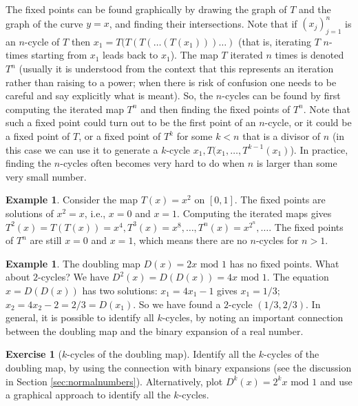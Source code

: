 \documentclass[11pt]{report}
\theoremstyle{plain}
\theoremstyle{definition}
\newtheorem{example}[thm]{Example}
\newtheorem{xexercise}[thm]{Exercise}
\begin{document}
The fixed points can be found graphically by drawing
the graph of $T$ and the graph of the curve $y=x$,
and finding their intersections. Note that if
$(x_j)_{j=1}^n$ is an $n$-cycle of $T$ then
$x_1 = T(T(T(\ldots(T(x_1)))\ldots)$ (that is,
iterating $T$ $n$-times starting from $x_1$ leads
back to $x_1$). The map $T$ iterated $n$ times is
denoted $T^n$ (usually it is understood from the
context that this represents an iteration rather than
raising to a power; when there is risk of confusion
one needs to be careful and say explicitly what is
meant). So, the $n$-cycles can be found by first
computing the iterated map $T^n$ and then finding the
fixed points of $T^n$. Note that such a fixed point
could turn out to be the first point of an $n$-cycle,
or it could be a fixed point of $T$, or a fixed point
of $T^k$ for some $k<n$ that is a divisor of $n$ (in
this case we can use it to generate a $k$-cycle
$x_1,T(x_1,\ldots,T^{k-1}(x_1)$). In practice,
finding the $n$-cycles often becomes very hard to do
when $n$ is larger than some very small number.

\begin{example}
Consider the map $T(x)=x^2$ on $[0,1]$. The fixed
points are solutions of $x^2=x$, i.e., $x=0$ and
$x=1$. Computing the iterated maps gives
$T^2(x)=T(T(x))=x^4, T^3(x)=x^8, \ldots,
T^n(x)=x^{2^n}, \ldots$.
The fixed points of $T^n$ are still $x=0$ and $x=1$,
which means there are no $n$-cycles for $n>1$.
\end{example}

\begin{example}
The doubling map $D(x)=2x\textrm{ mod }1$ has no
fixed points. What about $2$-cycles? We have
$D^2(x)=D(D(x))=4x\textrm{ mod }1$. The equation
$x=D(D(x))$ has two solutions: $x_1=4x_1-1$ gives
$x_1=1/3$; $x_2=4x_2-2=2/3 = D(x_1)$. So we have
found a $2$-cycle $(1/3,2/3)$. In general, it is
possible to identify all $k$-cycles, by noting an
important connection between the doubling map and the
binary expansion of a real number.
\end{example}

\begin{xexercise}[$k$-cycles of the doubling map]
Identify all the $k$-cycles of the doubling map, by
using the connection with binary expansions (see the
discussion in Section \ref{sec:normalnumbers}).
Alternatively, plot $D^k(x)=2^k x \textrm{ mod }1$
and use a graphical approach to identify all the
$k$-cycles.
\end{xexercise}
\end{document}
